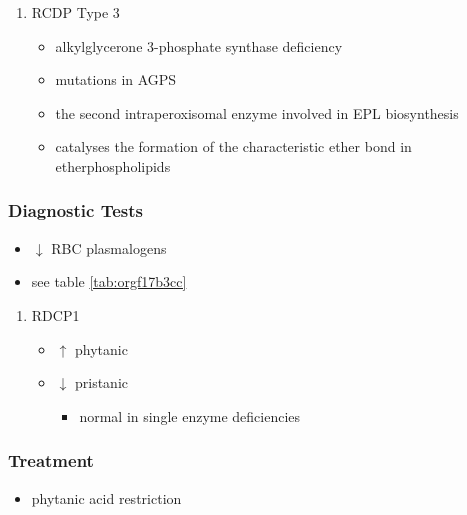 \documentclass[12pt]{scrartcl}
\begin{document}
\begin{enumerate}
\item RCDP Type 3
\label{sec:orgcf19c6b}
\begin{itemize}
\item alkylglycerone 3-phosphate synthase deficiency
\item mutations in AGPS
\item the second intraperoxisomal enzyme involved in EPL biosynthesis
\item catalyses the formation of the characteristic ether bond in etherphospholipids
\end{itemize}
\end{enumerate}

\subsubsection{Diagnostic Tests}
\label{sec:org9c26b05}
\begin{itemize}
\item \(\downarrow\) RBC plasmalogens
\item see table \ref{tab:orgf17b3cc}
\end{itemize}
\begin{enumerate}
\item RDCP1
\label{sec:orge48720d}
\begin{itemize}
\item \(\uparrow\) phytanic
\item \(\downarrow\) pristanic
\begin{itemize}
\item normal in single enzyme deficiencies
\end{itemize}
\end{itemize}
\end{enumerate}

\subsubsection{Treatment}
\label{sec:org68ee097}
\begin{itemize}
\item phytanic acid restriction
\end{itemize}
\end{document}
